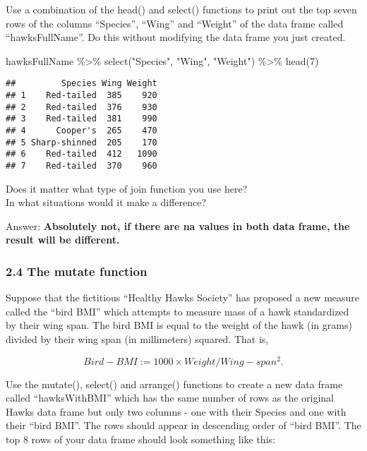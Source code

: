 \documentclass[
]{article}
\newenvironment{Shaded}{\begin{snugshade}}{\end{snugshade}}
\newcommand{\DecValTok}[1]{\textcolor[rgb]{0.00,0.00,0.81}{#1}}
\newcommand{\FunctionTok}[1]{\textcolor[rgb]{0.00,0.00,0.00}{#1}}
\newcommand{\NormalTok}[1]{#1}
\newcommand{\SpecialCharTok}[1]{\textcolor[rgb]{0.00,0.00,0.00}{#1}}
\newcommand{\StringTok}[1]{\textcolor[rgb]{0.31,0.60,0.02}{#1}}
\begin{document}
Use a combination of the head() and select() functions to print out the
top seven rows of the columns ``Species'', ``Wing'' and ``Weight'' of
the data frame called ``hawksFullName''. Do this without modifying the
data frame you just created.

\begin{Shaded}
\begin{Highlighting}[]
\NormalTok{hawksFullName }\SpecialCharTok{\%\textgreater{}\%} \FunctionTok{select}\NormalTok{(}\StringTok{"Species"}\NormalTok{, }\StringTok{"Wing"}\NormalTok{, }\StringTok{"Weight"}\NormalTok{) }\SpecialCharTok{\%\textgreater{}\%} \FunctionTok{head}\NormalTok{(}\DecValTok{7}\NormalTok{)}
\end{Highlighting}
\end{Shaded}

\begin{verbatim}
##         Species Wing Weight
## 1    Red-tailed  385    920
## 2    Red-tailed  376    930
## 3    Red-tailed  381    990
## 4      Cooper's  265    470
## 5 Sharp-shinned  205    170
## 6    Red-tailed  412   1090
## 7    Red-tailed  370    960
\end{verbatim}

Does it matter what type of join function you use here?\\
In what situations would it make a difference?

Answer: \textbf{Absolutely not, if there are na values in both data
frame, the result will be different.}

\hypertarget{the-mutate-function}{%
\subsubsection{2.4 The mutate function}\label{the-mutate-function}}

Suppose that the fictitious ``Healthy Hawks Society'' has proposed a new
measure called the ``bird BMI'' which attempts to measure mass of a hawk
standardized by their wing span. The bird BMI is equal to the weight of
the hawk (in grams) divided by their wing span (in millimeters) squared.
That is,

\[Bird-BMI := 1000 × Weight/Wing-span^2.\]

Use the mutate(), select() and arrange() functions to create a new data
frame called ``hawksWithBMI'' which has the same number of rows as the
original Hawks data frame but only two columns - one with their Species
and one with their ``bird BMI''. The rows should appear in descending
order of ``bird BMI''. The top 8 rows of your data frame should look
something like this:
\end{document}
